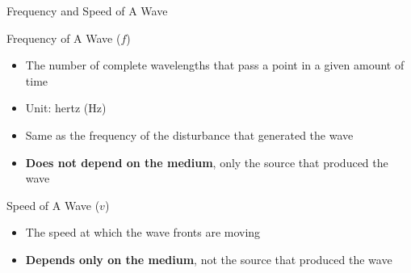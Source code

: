 \documentclass[12pt,aspectratio=169]{beamer}
\begin{document}
\begin{frame}{Frequency and Speed of A Wave}

  Frequency of A Wave ($f$)
  \begin{itemize}
  \item The number of complete wavelengths that pass a point in a given amount
    of time
  \item Unit: hertz (\si{\hertz})
  \item Same as the frequency of the disturbance that generated the wave
  \item\textbf{Does not depend on the medium}, only the source that produced
    the wave
  \end{itemize}

  \vspace{.2in}Speed of A Wave ($v$)
  \begin{itemize}
  \item The speed at which the wave fronts are moving
  \item\textbf{Depends only on the medium}, not the source that produced the
    wave
  \end{itemize}
\end{frame}
\end{document}
